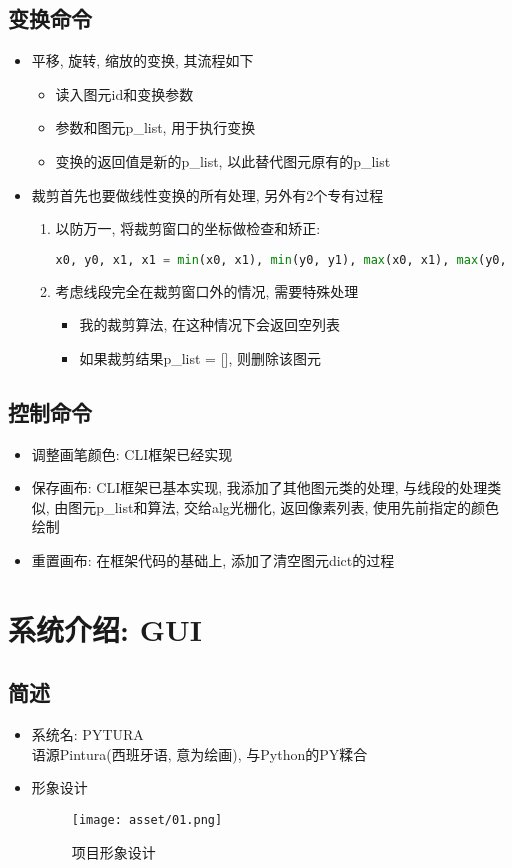 \documentclass[a4paper,UTF8]{article}
\theoremstyle{definition}
\begin{document}
\subsection{变换命令}
\begin{itemize}
  \item 平移, 旋转, 缩放的变换, 其流程如下\begin{itemize}
    \item 读入图元id和变换参数
    \item 参数和图元p\_list, 用于执行变换
    \item 变换的返回值是新的p\_list, 以此替代图元原有的p\_list
  \end{itemize}
  \item 裁剪首先也要做线性变换的所有处理, 另外有2个专有过程\begin{enumerate}
    \item 以防万一, 将裁剪窗口的坐标做检查和矫正:  \begin{lstlisting}[language={Python}]  
      x0, y0, x1, x1 = min(x0, x1), min(y0, y1), max(x0, x1), max(y0, y1)\end{lstlisting}
      \item 考虑线段完全在裁剪窗口外的情况, 需要特殊处理\begin{itemize}
        \item 我的裁剪算法, 在这种情况下会返回空列表
        \item 如果裁剪结果p\_list = [], 则删除该图元
      \end{itemize}
    \end{enumerate}
\end{itemize}
\subsection{控制命令}
\begin{itemize}
  \item 调整画笔颜色: CLI框架已经实现
  \item 保存画布: CLI框架已基本实现, 我添加了其他图元类的处理, 与线段的处理类似, 由图元p\_list和算法, 交给alg光栅化, 返回像素列表, 使用先前指定的颜色绘制
  \item 重置画布: 在框架代码的基础上, 添加了清空图元dict的过程
\end{itemize}

\section{系统介绍: GUI}
\subsection{简述}
\begin{itemize}
  \item 系统名: PYTURA\\
  语源Pintura(西班牙语, 意为绘画), 与Python的PY糅合
  \item 形象设计
  \begin{figure}[htp]
    \centering
    \texttt{[image: asset/01.png]}
    \caption{项目形象设计}
    \end{figure}
\end{itemize}
\end{document}
